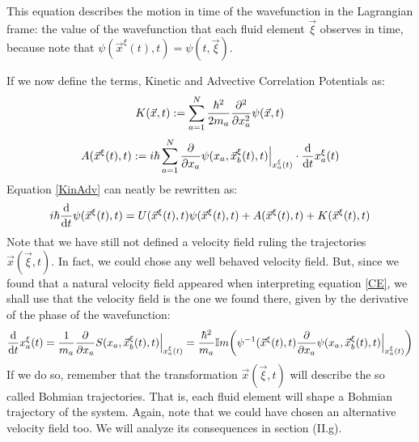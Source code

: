 \documentclass[11pt, a4paper]{article} %
\begin{document}
This equation describes the motion in time of the wavefunction in the Lagrangian frame: the value of the wavefunction that each fluid element $\vec{\xi}$ observes in time, because note that $\psi(\vec{x}^\xi(t),t)=\psi(t, \vec{\xi})$.

If we now define the terms, Kinetic and Advective Correlation Potentials as:\vspace{-0.1cm}
\begin{equation}\label{Kin}
K(\vec{x},t):=\sum_{a=1}^N \frac{\hbar^2}{2m_a}\pdv[2]{}{x_a}\psi(\vec{x},t)
\end{equation}\vspace{-0.1cm}
\begin{equation}\label{Adv}
A(\vec{x}^\xi(t),t):=i\hbar \sum_{a=1}^N \pdv{}{x_a}\psi(x_a,\vec{x}_b^\xi(t), t)\Big\rvert_{x^\xi_a(t)}\cdot \dv{}{t}x^\xi_a(t)
\end{equation}
Equation \eqref{KinAdv} can neatly be rewritten as:\vspace{-0.1cm}
\begin{equation}
i\hbar \dv{}{t}\psi(\vec{x}^\xi(t),t)=U(\vec{x}^\xi(t),t)\psi(\vec{x}^\xi(t),t)+A(\vec{x}^\xi(t),t)+K(\vec{x}^\xi(t),t)\vspace{-0.1cm}
\end{equation}
Note that we have still not defined a velocity field ruling the trajectories $\vec{x}(\vec{\xi},t)$. In fact, we could chose any well behaved velocity field. But, since we found that a natural velocity field appeared when interpreting equation \eqref{CE}, we shall use that the velocity field is the one we found there, given by the derivative of the phase of the wavefunction:
\begin{equation}\label{ImpBohm}
\dv{}{t}x_a^\xi(t)=\frac{1}{m_a}\pdv{}{x_a}S(x_a, \vec{x}_b^\xi(t),t)\Big\rvert_{x^\xi_a(t)}=\frac{\hbar^2}{m_a}\mathbb{I}m \qty( \psi^{-1}(\vec{x}^\xi(t),t)\pdv{}{x_a}\psi(x_a, \vec{x}_b^\xi(t),t)\Big\rvert_{x^\xi_a(t)})
\end{equation}
 If we do so, remember that the transformation $\vec{x}(\vec{\xi},t)$ will describe the so called Bohmian trajectories. That is, each fluid element will shape a Bohmian trajectory of the system. Again, note that we could have chosen an alternative velocity field too. We will analyze its consequences in section (II.g).
\end{document}
